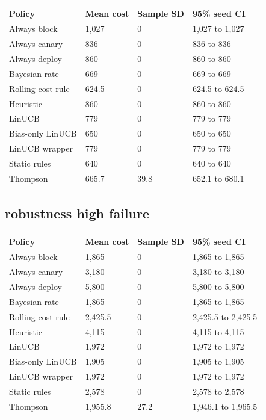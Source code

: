 \documentclass[
  10pt,
]{article}
\begin{document}
\par\medskip\noindent\begin{minipage}{\linewidth}\centering
\begin{tabular}{@{}llll@{}}
\toprule\noalign{}
Policy & Mean cost & Sample SD & 95\% seed CI \\
\midrule\noalign{}
Always block & 1,027 & 0 & 1,027 to 1,027 \\
Always canary & 836 & 0 & 836 to 836 \\
Always deploy & 860 & 0 & 860 to 860 \\
Bayesian rate & 669 & 0 & 669 to 669 \\
Rolling cost rule & 624.5 & 0 & 624.5 to 624.5 \\
Heuristic & 860 & 0 & 860 to 860 \\
LinUCB & 779 & 0 & 779 to 779 \\
Bias-only LinUCB & 650 & 0 & 650 to 650 \\
LinUCB wrapper & 779 & 0 & 779 to 779 \\
Static rules & 640 & 0 & 640 to 640 \\
Thompson & 665.7 & 39.8 & 652.1 to 680.1 \\
\bottomrule
\end{tabular}
\end{minipage}\par\medskip

\subsection{robustness high failure}\label{robustness-high-failure}

\par\medskip\noindent\begin{minipage}{\linewidth}\centering
\begin{tabular}{@{}llll@{}}
\toprule\noalign{}
Policy & Mean cost & Sample SD & 95\% seed CI \\
\midrule\noalign{}
Always block & 1,865 & 0 & 1,865 to 1,865 \\
Always canary & 3,180 & 0 & 3,180 to 3,180 \\
Always deploy & 5,800 & 0 & 5,800 to 5,800 \\
Bayesian rate & 1,865 & 0 & 1,865 to 1,865 \\
Rolling cost rule & 2,425.5 & 0 & 2,425.5 to 2,425.5 \\
Heuristic & 4,115 & 0 & 4,115 to 4,115 \\
LinUCB & 1,972 & 0 & 1,972 to 1,972 \\
Bias-only LinUCB & 1,905 & 0 & 1,905 to 1,905 \\
LinUCB wrapper & 1,972 & 0 & 1,972 to 1,972 \\
Static rules & 2,578 & 0 & 2,578 to 2,578 \\
Thompson & 1,955.8 & 27.2 & 1,946.1 to 1,965.5 \\
\bottomrule
\end{tabular}
\end{minipage}\par\medskip
\end{document}
